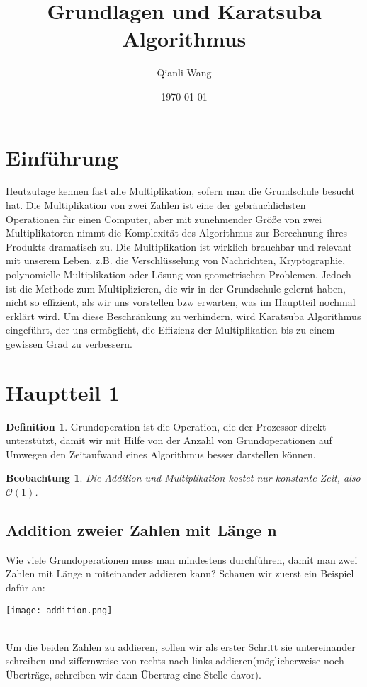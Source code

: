 \documentclass[11pt,a4paper, twoside]{article}
\author{Qianli Wang}
\title{Grundlagen und Karatsuba Algorithmus}
\date{\today}
\newtheorem{observation}[theorem]{Beobachtung}
\theoremstyle{definition}
\newtheorem{definition}[theorem]{Definition}
\begin{document}
\maketitle
\linenumbers
\thispagestyle{fancy}
\section{Einführung}
Heutzutage kennen fast alle Multiplikation, sofern man die Grundschule besucht hat. Die Multiplikation von zwei Zahlen ist eine der gebräuchlichsten Operationen für einen Computer, aber mit zunehmender Größe von zwei Multiplikatoren nimmt die Komplexität des Algorithmus zur Berechnung ihres Produkts dramatisch zu. Die Multiplikation ist wirklich brauchbar und relevant mit unserem Leben. z.B. die Verschlüsselung von Nachrichten, Kryptographie, polynomielle Multiplikation oder Lösung von geometrischen Problemen. Jedoch ist die Methode zum Multiplizieren, die wir in der Grundschule gelernt haben, nicht so effizient, als wir uns vorstellen bzw erwarten, was im Hauptteil nochmal erklärt wird. Um diese Beschränkung zu verhindern, wird Karatsuba Algorithmus eingeführt, der uns ermöglicht, die Effizienz der Multiplikation bis zu einem gewissen Grad zu verbessern.



\section{Hauptteil 1}
\begin{definition}Grundoperation ist die Operation, die der Prozessor direkt unterstützt, damit wir mit Hilfe von der Anzahl von Grundoperationen auf Umwegen den Zeitaufwand eines Algorithmus besser darstellen können.

\begin{observation}
Die Addition und Multiplikation kostet nur konstante Zeit, also $\mathcal{O}(1)$.
\end{observation}

\end{definition}
\subsection{Addition zweier Zahlen mit Länge n}
Wie viele Grundoperationen muss man mindestens durchführen, damit man zwei Zahlen mit Länge n miteinander addieren kann? Schauen wir zuerst ein Beispiel dafür an: \\
\centerline{\texttt{[image: addition.png]}}\\
Um die beiden Zahlen zu addieren, sollen wir als erster Schritt sie untereinander schreiben und ziffernweise von rechts nach links addieren(möglicherweise noch Überträge, schreiben wir dann Übertrag eine Stelle davor). 
\end{document}
